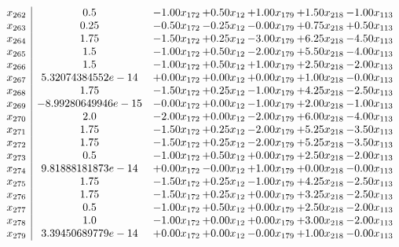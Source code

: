 \documentclass[8pt]{article}
\begin{document}
\[\begin{array}{c| c c@{\hskip 2pt} c@{\hskip 2pt} c@{\hskip 2pt} c@{\hskip 2pt} c@{\hskip 2pt} }
 x_{262}   &  0.5 & -1.00 x_{172} & +  0.50 x_{12} & +  1.00 x_{179} & +  1.50 x_{218} & -1.00 x_{113}\\
 x_{263}   &  0.25 & -0.50 x_{172} & -0.25 x_{12} & -0.00 x_{179} & +  0.75 x_{218} & +  0.50 x_{113}\\
 x_{264}   &  1.75 & -1.50 x_{172} & +  0.25 x_{12} & -3.00 x_{179} & +  6.25 x_{218} & -4.50 x_{113}\\
 x_{265}   &  1.5 & -1.00 x_{172} & +  0.50 x_{12} & -2.00 x_{179} & +  5.50 x_{218} & -4.00 x_{113}\\
 x_{266}   &  1.5 & -1.00 x_{172} & +  0.50 x_{12} & +  1.00 x_{179} & +  2.50 x_{218} & -2.00 x_{113}\\
 x_{267}   &  5.32074384552e-14 & +  0.00 x_{172} & +  0.00 x_{12} & +  0.00 x_{179} & +  1.00 x_{218} & -0.00 x_{113}\\
 x_{268}   &  1.75 & -1.50 x_{172} & +  0.25 x_{12} & -1.00 x_{179} & +  4.25 x_{218} & -2.50 x_{113}\\
 x_{269}   &  -8.99280649946e-15 & -0.00 x_{172} & +  0.00 x_{12} & -1.00 x_{179} & +  2.00 x_{218} & -1.00 x_{113}\\
 x_{270}   &  2.0 & -2.00 x_{172} & +  0.00 x_{12} & -2.00 x_{179} & +  6.00 x_{218} & -4.00 x_{113}\\
 x_{271}   &  1.75 & -1.50 x_{172} & +  0.25 x_{12} & -2.00 x_{179} & +  5.25 x_{218} & -3.50 x_{113}\\
 x_{272}   &  1.75 & -1.50 x_{172} & +  0.25 x_{12} & -2.00 x_{179} & +  5.25 x_{218} & -3.50 x_{113}\\
 x_{273}   &  0.5 & -1.00 x_{172} & +  0.50 x_{12} & +  0.00 x_{179} & +  2.50 x_{218} & -2.00 x_{113}\\
 x_{274}   &  9.81888181873e-14 & +  0.00 x_{172} & -0.00 x_{12} & +  1.00 x_{179} & +  0.00 x_{218} & -0.00 x_{113}\\
 x_{275}   &  1.75 & -1.50 x_{172} & +  0.25 x_{12} & -1.00 x_{179} & +  4.25 x_{218} & -2.50 x_{113}\\
 x_{276}   &  1.75 & -1.50 x_{172} & +  0.25 x_{12} & +  0.00 x_{179} & +  3.25 x_{218} & -2.50 x_{113}\\
 x_{277}   &  0.5 & -1.00 x_{172} & +  0.50 x_{12} & +  0.00 x_{179} & +  2.50 x_{218} & -2.00 x_{113}\\
 x_{278}   &  1.0 & -1.00 x_{172} & +  0.00 x_{12} & +  0.00 x_{179} & +  3.00 x_{218} & -2.00 x_{113}\\
 x_{279}   &  3.39450689779e-14 & +  0.00 x_{172} & +  0.00 x_{12} & -0.00 x_{179} & +  1.00 x_{218} & -0.00 x_{113}\\

\end{array}\]
\end{document}
